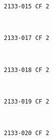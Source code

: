 \documentclass[11pt]{article}
\begin{document}
    \begin{Verbatim}[commandchars=\\\{\}]
2133-015 CF 2

    \end{Verbatim}

    \begin{center}
    \end{center}
    { \hspace*{\fill} \\}
    
    \begin{Verbatim}[commandchars=\\\{\}]
2133-017 CF 2

    \end{Verbatim}

    \begin{center}
    \end{center}
    { \hspace*{\fill} \\}
    
    \begin{Verbatim}[commandchars=\\\{\}]
2133-018 CF 2

    \end{Verbatim}

    \begin{center}
    \end{center}
    { \hspace*{\fill} \\}
    
    \begin{Verbatim}[commandchars=\\\{\}]
2133-019 CF 2

    \end{Verbatim}

    \begin{center}
    \end{center}
    { \hspace*{\fill} \\}
    
    \begin{Verbatim}[commandchars=\\\{\}]
2133-020 CF 2

    \end{Verbatim}
\end{document}
